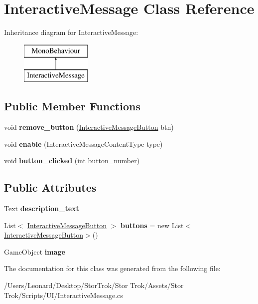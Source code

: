 \hypertarget{class_interactive_message}{}\section{Interactive\+Message Class Reference}
\label{class_interactive_message}
Inheritance diagram for Interactive\+Message\+:\begin{figure}[H]
\begin{center}
\leavevmode
\includegraphics[height=2.000000cm]{class_interactive_message}
\end{center}
\end{figure}
\subsection*{Public Member Functions}
\begin{DoxyCompactItemize}
\item 
\mbox{\label{class_interactive_message_a1fb9f1b10aed28d30c3460faab2675b1}} 
void {\bfseries remove\+\_\+button} (\hyperlink{class_interactive_message_button}{Interactive\+Message\+Button} btn)
\item 
\mbox{\label{class_interactive_message_a79614aef5ec800f9328e607c4f5ebcbb}} 
void {\bfseries enable} (Interactive\+Message\+Content\+Type type)
\item 
\mbox{\label{class_interactive_message_a1d8149d96b59c4034419733ecf35d537}} 
void {\bfseries button\+\_\+clicked} (int button\+\_\+number)
\end{DoxyCompactItemize}
\subsection*{Public Attributes}
\begin{DoxyCompactItemize}
\item 
\mbox{\label{class_interactive_message_ae5c09ea48c335dd92bc294118a140c95}} 
Text {\bfseries description\+\_\+text}
\item 
\mbox{\label{class_interactive_message_a9b28331618a1eb7e15e897b87e8ecd61}} 
List$<$ \hyperlink{class_interactive_message_button}{Interactive\+Message\+Button} $>$ {\bfseries buttons} = new List$<$\hyperlink{class_interactive_message_button}{Interactive\+Message\+Button}$>$()
\item 
\mbox{\label{class_interactive_message_a2c49d0ae14831a0ff25c8576c4b960fb}} 
Game\+Object {\bfseries image}
\end{DoxyCompactItemize}


The documentation for this class was generated from the following file\+:\begin{DoxyCompactItemize}
\item 
/\+Users/\+Leonard/\+Desktop/\+Stor\+Trok/\+Stor Trok/\+Assets/\+Stor Trok/\+Scripts/\+U\+I/Interactive\+Message.\+cs\end{DoxyCompactItemize}

